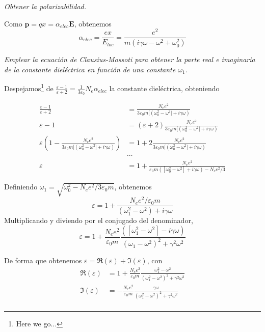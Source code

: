 \documentclass{tufte-book}
\begin{document}
\begin{tcolorbox}[halign=left]
  \emph{
    Obtener la polarizabilidad.
  }
\end{tcolorbox}

Como $\symbf{p} = q x = α_\mathit{elec} \symbf{E}$, obtenemos
\begin{equation}
  α_\mathit{elec} = \frac{e x}{E_\mathit{loc}} = \frac{e^{2}}{m \left(i γ ω - ω^{2} + ω_{0}^{2}\right)}
\end{equation}


\begin{tcolorbox}[halign=left]
  \emph{
    Emplear la ecuación de Clausius-Mossoti para obtener la parte real
    e imaginaria de la constante dieléctrica en función de una
    constante $ω_1$.
  }
\end{tcolorbox}

Despejamos\footnote{Here we go...} de $\frac{ε-1}{ε+2} = \frac{1}{3ε_0} N_\mathit{e}
α_\mathit{elec}$ la constante dieléctrica, obteniendo

\begin{equation}
  \begin{split}
    \frac{ε-1}{ε+2} &= \frac{N_e e^2}{3ε_0m[(ω_0^2-ω^2]+iγω)} \\
    ε-1 &= (ε+2)\frac{N_e e^2}{3ε_0m[(ω_0^2-ω^2]+iγω)} \\
    ε\left(1- \frac{N_e e^2}{3ε_0m[(ω_0^2-ω^2]+iγω)}\right) &= 1 + 2\frac{N_e
      e^2}{3ε_0m[(ω_0^2-ω^2]+iγω)}\\
    &⋯ \\
    ε &= 1 + \frac{N_e e^2}{ε_0 m ([ω_0^2-ω^2] + iγω) - N_e e^2 / 3}
  \end{split}
\end{equation}

Definiendo $ω_1 = \sqrt{ω_0^2 - N_e e^2 / 3 ε_0 m}$, obtenemos
\begin{equation}
  ε = 1 + \frac{N_e e^2 / ε_0 m}{(ω_1^2 - ω^2) +iγω}
\end{equation}
Multiplicando y diviendo por el conjugado del denominador,
\begin{equation}
  ε = 1 + \frac{N_e e^2}{ε_0m} \frac{ ([ω_1^2-ω^2] - iγω)}{(ω_1-ω^2)^2
    + γ^2ω^2}
\end{equation}

De forma que obtenemos $ε = \Re (ε) + \Im (ε)$, con
\begin{align}
  \Re (ε) &= 1 + \frac{N_e e^2}{ε_0 m} \frac{ω_1^2 - ω^2}{(ω_1^2-ω^2)^2 +
  γ^2 ω^2} \\
  \Im (ε) &= - \frac{N_e e^2}{ε_0 m} \frac{γω}{(ω_1^2-ω^2)^2 + γ^2 ω^2}\\
\end{align}
\end{document}
